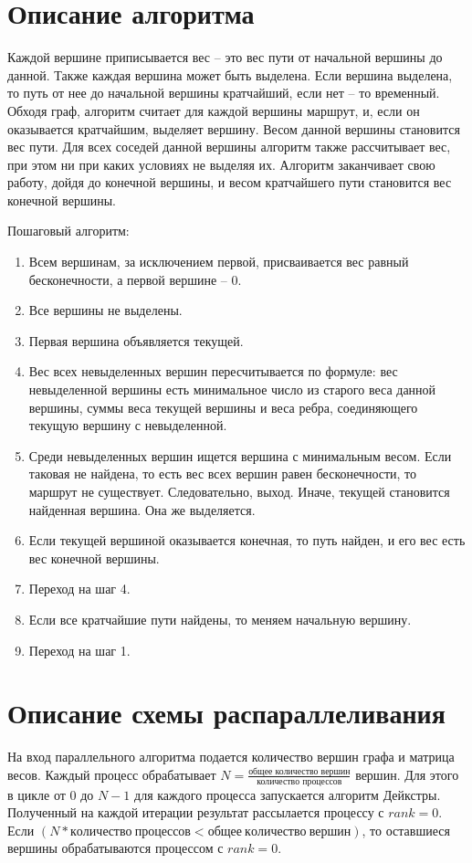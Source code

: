 \documentclass{report}
\begin{document}
\section*{Описание алгоритма}
\par Каждой вершине приписывается вес – это вес пути от начальной вершины до данной. Также каждая вершина может быть выделена. Если вершина выделена, то путь от нее до начальной вершины кратчайший, если нет – то временный. Обходя граф, алгоритм считает для каждой вершины маршрут, и, если он оказывается кратчайшим, выделяет вершину. Весом данной вершины становится вес пути. Для всех соседей данной вершины алгоритм также рассчитывает вес, при этом ни при каких условиях не выделяя их. Алгоритм заканчивает свою работу, дойдя до конечной вершины, и весом кратчайшего пути становится вес конечной вершины.
\par Пошаговый алгоритм:
\begin{enumerate}
\item Всем вершинам, за исключением первой, присваивается вес равный бесконечности, а первой вершине – 0.
\item Все вершины не выделены.
\item Первая вершина объявляется текущей.
\item Вес всех невыделенных вершин пересчитывается по формуле: вес невыделенной вершины есть минимальное число из старого веса данной вершины, суммы веса текущей вершины и веса ребра, соединяющего текущую вершину с невыделенной.
\item Среди невыделенных вершин ищется вершина с минимальным весом. Если таковая не найдена, то есть вес всех вершин равен бесконечности, то маршрут не существует. Следовательно, выход. Иначе, текущей становится найденная вершина. Она же выделяется.
\item Если текущей вершиной оказывается конечная, то путь найден, и его вес есть вес конечной вершины.
\item Переход на шаг 4.
\item Если все кратчайшие пути найдены, то меняем начальную вершину.
\item Переход на шаг 1.
\end{enumerate}

\newpage

\section*{Описание схемы распараллеливания}
\par На вход параллельного алгоритма подается количество вершин графа и матрица весов. Каждый процесс обрабатывает $N=\frac{\text{общее количество вершин}}{\text{количество процессов}}$ вершин. Для этого в цикле от $0$ до $N-1$ для каждого процесса запускается алгоритм Дейкстры. Полученный на каждой итерации результат рассылается процессу с $rank=0$. Если $(N*количество \ процессов<общее \ количество \ вершин)$, то оставшиеся вершины обрабатываются процессом с $rank=0$.
\end{document}
